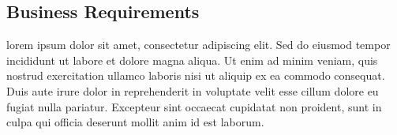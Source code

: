 \subsection{Business Requirements}
lorem ipsum dolor sit amet, consectetur adipiscing elit.
Sed do eiusmod tempor incididunt ut labore et dolore magna aliqua. 
Ut enim ad minim veniam, quis nostrud exercitation ullamco laboris 
nisi ut aliquip ex ea commodo consequat. Duis aute irure dolor 
in reprehenderit in voluptate velit esse cillum dolore eu fugiat 
nulla pariatur. Excepteur sint occaecat cupidatat non proident, 
sunt in culpa qui officia deserunt mollit anim id est laborum.